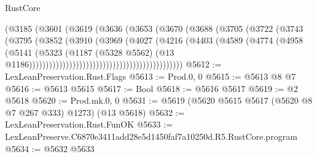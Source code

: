 \begin{lexlean}{RustCore}
\begin{coremodule}
                                                (@3185
                                                  (@3601
                                                    (@3619
                                                      (@3636
                                                        (@3653
                                                          (@3670
                                                            (@3688
                                                              (@3705
                                                                (@3722
                                                                  (@3743
                                                                    (@3795
                                                                      (@3852
                                                                        (@3910
                                                                          (@3969
                                                                            (@4027
                                                                              (@4216
                                                                                (@4403
                                                                                  (@4589
                                                                                    (@4774
                                                                                      (@4958
                                                                                        (@5141
                                                                                          (@5323
                                                                                            (@1187
                                                                                              (@5328
                                                                                                @5562)
                                                                                              (@13
                                                                                                @1186))))))))))))))))))))))))))))))))))))))))))))))
@5612 := LexLeanPreservation.Rust.Flags
@5613 := Prod.{0, 0}
@5615 := @5613 @8 @7
@5616 := @5613 @5615
@5617 := Bool
@5618 := @5616 @5617
@5619 := @2 @5618
@5620 := Prod.mk.{0, 0}
@5631 := @5619 (@5620 @5615 @5617 (@5620 @8 @7 @267 @333) @1273) (@13 @5618)
@5632 := LexLeanPreservation.Rust.FunOK
@5633 := LexLeanPreserve.C6870e3411add28e5d1450faf7a10250d.R5.RustCore.program
@5634 := @5632 @5633

\end{coremodule}
\end{lexlean}
